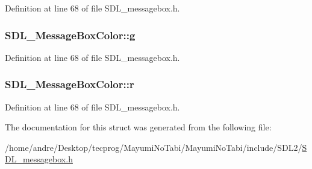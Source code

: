 Definition at line 68 of file S\-D\-L\-\_\-messagebox.\-h.

\hypertarget{struct_s_d_l___message_box_color_a5820adab0b32aa3eade101ea36ed6b4a}{
\subsubsection[{g}]{ S\-D\-L\-\_\-\-Message\-Box\-Color\-::g}}\label{struct_s_d_l___message_box_color_a5820adab0b32aa3eade101ea36ed6b4a}


Definition at line 68 of file S\-D\-L\-\_\-messagebox.\-h.

\hypertarget{struct_s_d_l___message_box_color_a43ab2172c10058380fcf67ecc3f53184}{
\subsubsection[{r}]{ S\-D\-L\-\_\-\-Message\-Box\-Color\-::r}}\label{struct_s_d_l___message_box_color_a43ab2172c10058380fcf67ecc3f53184}


Definition at line 68 of file S\-D\-L\-\_\-messagebox.\-h.



The documentation for this struct was generated from the following file\-:\begin{DoxyCompactItemize}
\item 
/home/andre/\-Desktop/tecprog/\-Mayumi\-No\-Tabi/\-Mayumi\-No\-Tabi/include/\-S\-D\-L2/\hyperlink{_s_d_l__messagebox_8h}{S\-D\-L\-\_\-messagebox.\-h}\end{DoxyCompactItemize}
